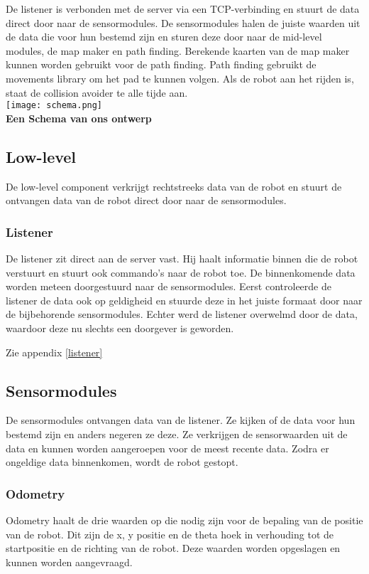 \documentclass[a4paper,10pt]{article}
\begin{document}
De listener is verbonden met de server via een TCP-verbinding en stuurt de data direct door naar de sensormodules. De sensormodules halen de juiste waarden uit de data die voor hun bestemd zijn en sturen deze door naar de mid-level modules, de map maker en path finding. Berekende kaarten van de map maker kunnen worden gebruikt voor de path finding. Path finding gebruikt de movements library om het pad te kunnen volgen. Als de robot aan het rijden is, staat de collision avoider te alle tijde aan.\\

\texttt{[image: schema.png]}\\
\textbf{Een Schema van ons ontwerp}
\\
\subsection{Low-level}
De low-level component verkrijgt rechtstreeks data van de robot en stuurt de ontvangen data van de robot direct door naar de sensormodules.

\subsubsection{Listener}
De listener zit direct aan de server vast. Hij haalt informatie binnen die de robot verstuurt en stuurt ook commando's naar de robot toe. De binnenkomende data worden meteen doorgestuurd naar de sensormodules. Eerst controleerde de listener de data ook op geldigheid en stuurde deze in het juiste formaat door naar de bijbehorende sensormodules. Echter werd de listener overwelmd door de data, waardoor deze nu slechts een doorgever is geworden.

Zie appendix \ref{listener}

\subsection{Sensormodules}
De sensormodules ontvangen data van de listener. Ze kijken of de data voor hun bestemd zijn en anders negeren ze deze. Ze verkrijgen de sensorwaarden uit de data en kunnen worden aangeroepen voor de meest recente data. Zodra er ongeldige data binnenkomen, wordt de robot gestopt.

\subsubsection{Odometry}
Odometry haalt de drie waarden op die nodig zijn voor de bepaling van de positie van de robot. Dit zijn de x, y positie en de theta hoek in verhouding tot de startpositie en de richting van de robot. Deze waarden worden opgeslagen en kunnen worden aangevraagd.
\end{document}
